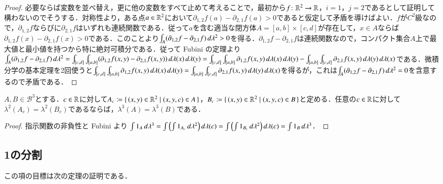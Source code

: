\begin{proof}
必要ならば変数を並べ替え，更に他の変数をすべて止めて考えることで，最初から$f\colon \mathbb{R}^2 \to \mathbb{R}$，$i=1$，$j=2$であるとして証明して構わないのでそうする．対称性より，ある点$a \in \mathbb{R}^2$において$\partial_{1,2} f (a) - \partial_{2,1} f (a) > 0$であると仮定して矛盾を導けばよい．$f$が$C^2$級なので，$\partial_{1,2}f$ならびに$\partial_{2,1}f$はいずれも連続関数である．従って$a$を含む適当な閉方体$A = [a,b] \times [c,d]$が存在して，$x \in A$ならば$\partial_{1,2} f (x) - \partial_{2,1} f(x) > 0$である．このことより$\int_A (\partial_{1,2} f - \partial_{2,1} f) \mathop{}\!d\lambda^2 > 0$を得る．$\partial_{1,2} f - \partial_{2,1} f$は連続関数なので，コンパクト集合$A$上で最大値と最小値を持つから特に絶対可積分である．従って Fubini の定理より$\int_A (\partial_{1,2} f - \partial_{2,1} f) \mathop{}\!d\lambda^2 = \int_{[c,d]} \int_{[a,b]}(\partial_{1,2} f(x,y) - \partial_{2,1} f(x,y)) \mathop{}\!d\lambda(x) \mathop{}\!d\lambda(y) = \int_{[c,d]} \int_{[a,b]}\partial_{1,2} f(x,y) \mathop{}\!d\lambda(x) \mathop{}\!d\lambda(y) - \int_{[a,b]} \int_{[c,d]}\partial_{2,1} f(x,y) \mathop{}\!d\lambda(y) \mathop{}\!d\lambda(x)$である．微積分学の基本定理を2回使うと$\int_{[c,d]} \int_{[a,b]}\partial_{1,2} f(x,y) \mathop{}\!d\lambda(x) \mathop{}\!d\lambda(y) = \int_{[a,b]} \int_{[c,d]}\partial_{2,1} f(x,y) \mathop{}\!d\lambda(y) \mathop{}\!d\lambda(x)$を得るが，これは$\int_A (\partial_{1,2} f - \partial_{2,1} f) \mathop{}\!d\lambda^2 = 0$を含意するので矛盾である．
\end{proof}

\begin{prop}
$A, B \in \mathcal{B}^3$とする．$c \in \mathbb{R}$に対して$A_c \coloneqq \set{(x,y) \in \mathbb{R}^2 | (x,y,c) \in A }$，$B_c \coloneqq \set{(x,y) \in \mathbb{R}^2 | (x,y,c) \in B }$と定める．任意の$c \in \mathbb{R}$に対して$\lambda^2(A_c) = \lambda^2(B_c)$であるならば，$\lambda^3(A) = \lambda^3(B)$である．
\end{prop}

\begin{proof}指示関数の非負性と Fubini より
$\int 1_A \mathop{}\!d\lambda^3 = \int \left(\int 1_{A_c}  \mathop{}\!d\lambda^2\right) \mathop{}\!d\lambda(c) = \int \left(\int 1_{B_c}  \mathop{}\!d\lambda^2\right) \mathop{}\!d\lambda(c) = \int 1_B \mathop{}\!d\lambda^3$．
\end{proof}

\subsection{1の分割}

この項の目標は次の定理の証明である．

